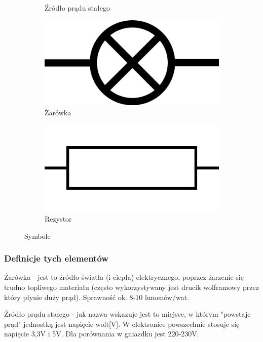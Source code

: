 \documentclass[a4paper,12pt, twoside]{article}
\begin{document}
\begin{figure}
\begin{subfigure}[h]{0.25\textwidth}
      \caption{Źródło prądu stałego}
			\label{fig:DC}
   \end{subfigure}
	\begin{subfigure}[h]{0.25\textwidth}
      \centering
      \includegraphics[scale=0.2]{LightBulb.png}
      \caption{Żarówka}
			\label{fig:zar}
   \end{subfigure}
	\begin{subfigure}[h]{0.25\textwidth}
      \centering
      \includegraphics[scale=0.05]{Resistor-Europe.png}
      \caption{Rezystor}
			\label{fig:rezystor}
   \end{subfigure}
	\caption{Symbole}
	\label{fig:symbole}
\end{figure}
\FloatBarrier
   \subsubsection{Definicje tych elementów}
	
Żarówka - jest to źródło światła (i ciepła) elektrycznego, poprzez żarzenie się trudno topliwego materiału (często wykorzystywany jest drucik wolframowy przez który płynie duży prąd). Sprawność ok.
8-10 lumenów/wat. 

Źródło prądu stałego - jak nazwa wskazuje jest to miejsce, w którym "powstaje prąd" jednostką jest napięcie wolt[V]. W elektronice powszechnie stosuje się napięcie 3,3V i 5V. Dla porównania w gniazdku jest 220-230V.
\end{document}
